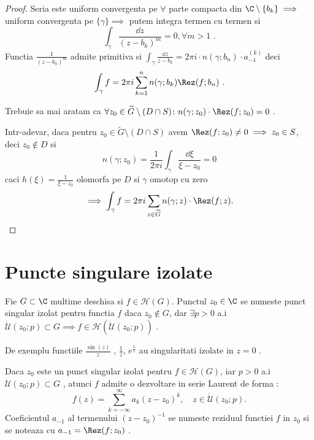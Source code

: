 \begin{theorem}
\begin{proof}
        Seria este uniform convergenta pe $\forall$ parte compacta din
        $\C \setminus \{b_k \} \implies$ uniform convergenta pe
        $\{ \gamma \} \implies$ putem integra termen cu termen si
        \[
            \int_{\gamma} \frac{\dd z}{(z-b_k)^m}  = 0 , \forall m>1 \text{ .}
        \]
        Functia $\displaystyle \frac{1}{(z-b_n)^m}$ admite primitiva si
        $\displaystyle
            \int_{\gamma} \frac{\dd z} {z - b_k} = 2 \pi i \cdot n(\gamma;b_n) \cdot a_{-1}^{(k)}
        $ deci
        \[
            \int_{\gamma} f = 2 \pi i \sum_{k=1}^{n} n(\gamma; b_k) \Rez(f;b_n)  \text{ .}
        \]

        Trebuie sa mai aratam ca $\forall z_0 \in \widetilde{G} \setminus(D \cap S)
        \colon n(\gamma; z_0)\cdot \Rez(f;z_0) = 0$ .

        Intr-adevar, daca pentru
        $z_0\in \widetilde{G} \setminus (D\cap S)$ avem
        $\Rez(f;z_0) \neq 0 \implies z_0 \in S $, deci $z_0\notin D$ si
        \[
            n(\gamma;z_0) = \frac{1}{2 \pi i} \int_{\gamma}
            \frac{\dd \xi}{\xi - z_0} = 0
        \] 
        caci $h(\xi) = \frac{1}{\xi - z_0}$ olomorfa pe $D$ si $\gamma$ omotop cu zero
        \[
            \implies \int_{\gamma} f = 2 \pi i \sum_{z\in \widetilde{G}} n(\gamma;z) \cdot \Rez(f;z) .
        \]

    \end{proof}
\end{theorem}

\section{Puncte singulare izolate}

\begin{definition}
    Fie $G\subset \C$ multime deschisa si $f\in\mathcal{H}(G)$. Punctul $z_0 \in \C$
    se numeste punct singular izolat pentru functia $f$ daca $z_0 \notin G$, dar
    $\exists p>0$ a.i
    $\mathcal{\dot{U}}(z_0;p)\subset G \implies f \in \mathcal{H}(\mathcal{\dot{U}}(z_0;p))$ .
\end{definition}

\begin{observation}
    De exemplu functiile $\frac{\sin(z)}{z}$ , $\frac{1}{z}$, $e^{\frac{1}{z}}$
    au singularitati izolate in $z=0$ .
\end{observation}

\begin{observation}
    Daca $z_0$ este un punct singular izolat pentru $f\in\mathcal{H}(G)$, iar
    $p>0$ a.i $\mathcal{\dot{U}}(z_0;p)\subset G$ , atunci $f$ admite o dezvoltare in
    serie Laurent de forma :
    \[
        f(z) = \sum_{k=-\infty}^{\infty} a_{k}(z-z_0)^{k},\quad z\in \mathcal{\dot{U}}(z_0;p) .
    \]
    Coeficientul $a_{-1}$ al termenului $(z-z_0)^{-1}$ se numeste reziduul functiei $f$
    in $z_0$ si se noteaza cu $a_{-1} = \Rez(f;z_0)$ .
\end{observation}

